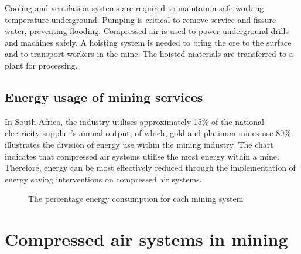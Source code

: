 	 Cooling and ventilation systems are required to maintain a safe working temperature underground. Pumping is critical to remove service and fissure water, preventing flooding. Compressed air is used to power underground drills and machines safely. A hoisting system is needed to bring the ore to the surface and to transport workers in the mine. The hoisted materials are transferred to a plant for processing.  
		
		\subsection{Energy usage of mining services}
		
			In South Africa, the industry utilises approximately 15\% of the national electricity supplier's annual output, of which, gold and platinum mines use 80\%\footnotemark[1].  illustrates the division of energy use within the mining industry. The chart indicates that compressed air systems utilise the most energy within a mine. Therefore, energy can be most effectively reduced through the implementation of energy saving interventions on compressed air systems.
			\begin{figure}[h]
				\centering
				\fbox{}
				\caption[The percentagee energy consumption for each mining system]{The percentage energy consumption for each mining system \cite{le2005energy}}
				\label{fig: Energy Split}
			\end{figure}
\section{Compressed air systems in mining}
